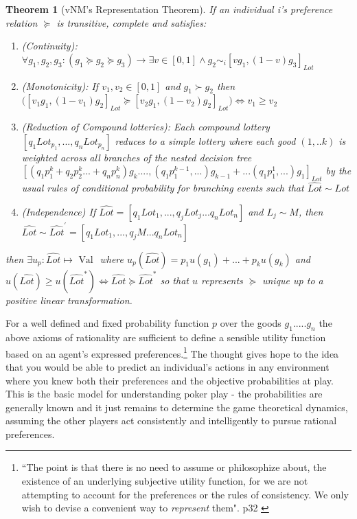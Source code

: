 \documentclass{tufte-handout}
\newtheorem{theo}[section]{Theorem}
\newenvironment{ftheo}[1]
  {\begin{mdframed}
  \sloppy
  \begin{theo}[#1]
  }
  {\end{theo}
\end{mdframed}}
\begin{document}
\begin{ftheo}{vNM's Representation Theorem}
If an individual i's preference relation $\succeq$ is transitive, complete and satisfies: \begin{enumerate}
\item (Continuity): $\forall g_{1} , g_{2} , g_{3} : ( g_{1} \succeq g_{2} \succeq g_{3}) \rightarrow \exists v \in [0, 1] \wedge g_{2} \sim_{i} [v g_{1}, (1-v) g_{3}]_{Lot}$
\item (Monotonicity): If $ v_{1}, v_{2} \in [0, 1]$ and $ g_{1} \succ g_{2}$ then  $ \Big( [ v_{1} g_{1}, (1-v_{1})g_{2}]_{Lot} \succeq [ v_{2} g_{1}, (1-v_{2})g_{2}]_{Lot} \Big) \Leftrightarrow v_{1} \geq v_{2}$
\item (Reduction of Compound lotteries): Each compound lottery ${[q_{1}Lot_{p_{1}}, ...,  q_{n}Lot_{p_{n}}]}$ reduces to a simple lottery where each good $(1, .. k)$ is weighted across all branches of the nested decision tree ${[(q_{1}p^{k}_{1} + q_{2}p^{k}_{2} ... + q_{n}p^{k}_{n})g_{k} .... , (q_{1}p^{k-1}_{1} , ...)g_{k-1} + ... (q_{1}p^{1}_{1} , ...)g_{1}]_{Lot}}$ by the usual rules of conditional probability for branching events such that $\widehat{Lot} \sim Lot$ 
\item (Independence) If $\widehat{Lot} = [q_{1}Lot_{1}, ..., q_{j}Lot_{j}...q_{n}Lot_{n}]$ and $L_{j} \sim M$, then $\widehat{Lot} \sim \widehat{Lot}^{'} = [q_{1}Lot_{1}, ..., q_{j}M...q_{n}Lot_{n}]$ 
\end{enumerate}  
then $\exists u_{p} :\widehat{Lot} \mapsto \text{ Val } $ where 
$ u_{p}(\widehat{Lot}) = p_{1}u(g_{1}) + ... + p_{k}u(g_{k}) $ and  $u(\widehat{Lot}) \geq u(\widehat{Lot}^{*}) \Leftrightarrow \widehat{Lot} \succeq \widehat{Lot}^{*}$ so that $u$ represents $\succeq$ unique up to a positive linear transformation.
\end{ftheo}

\noindent For a well defined and fixed probability function $p$ over the goods $g_{1} ..... g_{n}$ the above axioms of rationality are sufficient to define a sensible utility function based on an agent's expressed preferences.\footnote{``The point is that there is no need to assume or philosophize about, the existence of an underlying subjective utility function, for we are not attempting to account for the preferences or the rules of consistency. We only wish to devise a convenient way to  \textit{represent} them". p32 \cite{luce1989games}} The thought gives hope to the idea that you would be able to predict an individual's actions in any environment where you knew both their preferences and the objective probabilities at play. This is the basic model for understanding poker play - the probabilities are generally known and it just remains to determine the game theoretical dynamics, assuming the other players act consistently and intelligently to pursue rational preferences. 
\end{document}
